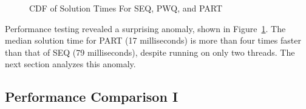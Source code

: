 \begin{figure}[tb]
\begin{center}
\end{center}
\caption{CDF of Solution Times For SEQ, PWQ, and PART}
\label{fig:SMPdesign:CDF of Solution Times For SEQ, PWQ, and PART}
\end{figure}

Performance testing revealed a surprising anomaly, shown in
Figure~\ref{fig:SMPdesign:CDF of Solution Times For SEQ, PWQ, and PART}.
The median solution time for PART (17 milliseconds)
is more than four times faster than that of SEQ (79 milliseconds),
despite running on only two threads.
The next section analyzes this anomaly.

\subsection{Performance Comparison I}
\label{sec:SMPdesign:Performance Comparison I}

